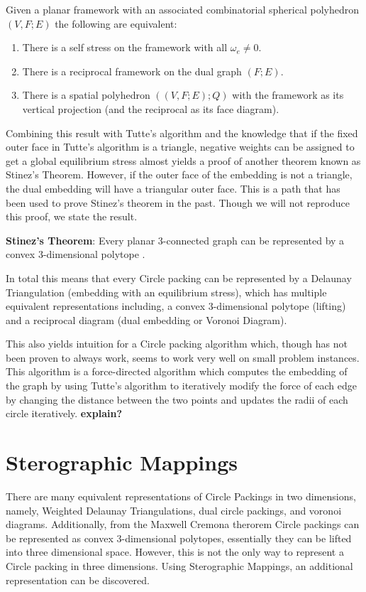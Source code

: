 \documentclass[11pt]{article}
\begin{document}
Given a planar framework with an associated combinatorial spherical polyhedron $(V,F;E)$ the following are equivalent:
\begin{enumerate}
	\item There is a self stress on the framework with all $\omega_e \neq 0$.
	\item There is a reciprocal framework on the dual graph $(F;E)$.
	\item There is a spatial polyhedron $((V,F;E);Q)$ with the framework as its vertical projection (and the reciprocal as its face diagram).
 \end{enumerate}
 
 Combining this result with Tutte's algorithm and the knowledge that if the fixed outer face in Tutte's algorithm is a triangle, negative weights can be assigned to get a global equilibrium stress almost yields a proof of another theorem known as Stinez's Theorem. However, if the outer face of the embedding is not a triangle, the dual embedding will have a triangular outer face. This is a path that has been used to prove Stinez's theorem in the past. Though we will not reproduce this proof, we state the result.
 
 \textbf{Stinez's Theorem}: Every planar 3-connected graph can be represented by a convex 3-dimensional polytope \cite{realizationSpaces}.
 
 In total this means that every Circle packing can be represented by a Delaunay Triangulation (embedding with an equilibrium stress), which has multiple equivalent representations including, a convex 3-dimensional polytope (lifting) and a reciprocal diagram (dual embedding or Voronoi Diagram). 

This also yields intuition for a Circle packing algorithm which, though has not been proven to always work, seems to work very well on small problem instances. This algorithm is a force-directed algorithm which computes the embedding of the graph by using Tutte's algorithm to iteratively modify the force of each edge by changing the distance between the two points and updates the radii of each circle iteratively. \textbf{explain?}
 
\section{Sterographic Mappings}
There are many equivalent representations of Circle Packings in two dimensions, namely, Weighted Delaunay Triangulations, dual circle packings, and voronoi diagrams. Additionally, from the Maxwell Cremona therorem Circle packings can be represented as convex 3-dimensional polytopes, essentially they can be lifted into three dimensional space. However, this is not the only way to represent a Circle packing in three dimensions. Using Sterographic Mappings, an additional representation can be discovered. 
\end{document}
